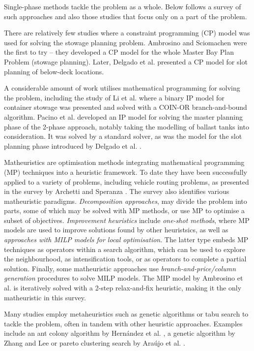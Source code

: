 \documentclass[preprint,11pt,3p]{elsarticle}
\begin{document}
Single-phase methods tackle the problem as a whole. Below follows a survey of such approaches and also those studies that focus only on a part of the problem.

There are relatively few studies where a constraint programming (CP) model was used for solving the stowage planning problem. Ambrosino and Sciomachen \cite{AS98} were the first to try -- they developed a CP model for the whole Master Bay Plan Problem (stowage planning). Later, Delgado et al. \cite{DJJRA12} presented a CP model for slot planning of below-deck locations.

A considerable amount of work utilises mathematical programming for solving the problem, including the study of Li et al. \cite{LTCD08} where a binary IP model for container stowage was presented and solved with a COIN-OR branch-and-bound algorithm. Pacino et al. \cite{PDJB12} developed an IP model for solving the master planning phase of the 2-phase approach, notably taking the modelling of ballast tanks into consideration. It was solved by a standard solver, as was the model for the slot planning phase introduced by Delgado et al. \cite{DJJRA12}. 

Matheuristics are optimisation methods integrating mathematical programming (MP) techniques into a heuristic framework. To date they have been successfully applied to a variety of problems, including vehicle routing problems, as presented in the survey by Archetti and Speranza \cite{AS14}. The survey also identifies various matheuristic paradigms. \textit{Decomposition approaches}, may divide the problem into parts, some of which may be solved with MP methods, or use MP to optimise a subset of objectives. \textit{Improvement heuristics} include \textit{one-shot methods}, where MP models are used to improve solutions found by other heuristsics, as well as \textit{approaches with MILP models for local optimisation}. The latter type embeds MP techniques as operators within a search algorithm, which can be used to explore the neighbourhood, as intensification tools, or as operators to complete a partial solution. Finally, some matheuristic approaches use \textit{branch-and-price/column generation} procedures to solve MILP models. The MIP model by Ambrosino et al. \cite{APS15} is iteratively solved with a 2-step relax-and-fix heuristic, making it the only matheuristic in this survey.

Many studies employ metaheuristics such as genetic algorithms or tabu search to tackle the problem, often in tandem with other heuristic approaches. Examples include an ant colony algorithm by Hern\'{a}ndez et al. \cite{H13}, a genetic algorithm by Zhang and Lee \cite{ZL15} or pareto clustering search by Ara\'{u}jo et al. \cite{AACS16}.
\end{document}
